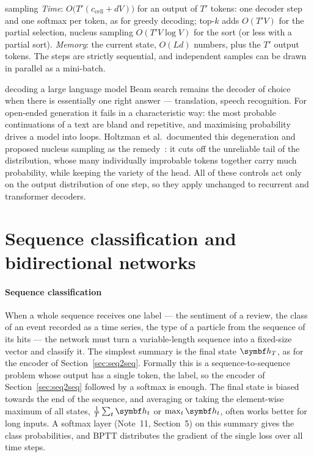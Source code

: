 \documentclass[11pt]{article}
\newcommand{\hv}{\vect{h}}
\begin{document}
\begin{runtime}{sampling}
\emph{Time}: $O\big(T'(c_{\mathrm{cell}} + dV)\big)$ for an output of $T'$ tokens: one decoder step and one softmax per
token, as for greedy decoding; top-$k$ adds $O(T'V)$ for the partial selection, nucleus sampling $O(T'V\log V)$ for the
sort (or less with a partial sort). \emph{Memory}: the current state, $O(Ld)$ numbers, plus the $T'$ output tokens.
The steps are strictly sequential, and independent samples can be drawn in parallel as a mini-batch.
\end{runtime}

\begin{modern}{decoding a large language model}
Beam search remains the decoder of choice when there is essentially one right answer --- translation, speech
recognition. For open-ended generation it fails in a characteristic way: the most probable continuations of a text are
bland and repetitive, and maximising probability drives a model into loops. Holtzman et al.\ documented this
degeneration and proposed nucleus sampling as the remedy~\cite{holtzman2020}: it cuts off the unreliable tail of the
distribution, whose many individually improbable tokens together carry much probability, while keeping the variety of
the head. All of these controls act only on the output distribution of one step, so they apply unchanged to recurrent and transformer decoders.
\end{modern}

\section{Sequence classification and bidirectional networks}\label{sec:bidir}

\paragraph{Sequence classification} When a whole sequence receives one label --- the sentiment of a review, the class of
an event recorded as a time series, the type of a particle from the sequence of its hits --- the network must turn a
variable-length sequence into a fixed-size vector and classify it. The simplest summary is the final state $\hv_T$, as
for the encoder of Section~\ref{sec:seq2seq}. Formally this is a sequence-to-sequence problem whose output has a single
token, the label, so the encoder of Section~\ref{sec:seq2seq} followed by a softmax is enough. The final state is biased towards the end of the sequence, and averaging or taking the element-wise
maximum of all states, $\frac1T\sum_t\hv_t$ or $\max_t\hv_t$, often works better for long inputs. A softmax layer
(Note~11, Section~5) on this summary gives the class probabilities, and BPTT distributes the gradient of the single loss
over all time steps.
\end{document}
